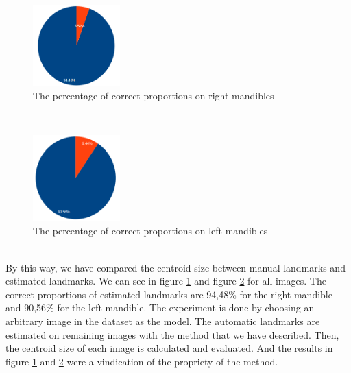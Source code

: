 \documentclass[twoside,twocolumn,10pt]{article}
\begin{document}
\begin{figure}[htb]
    \centering
    \includegraphics[width=0.3\textwidth]{./images/mdresult}
    \caption{The percentage of correct proportions on right mandibles }
    \label{figmdresult}
\end{figure}~\\
\begin{figure}[htb]
    \centering
    \includegraphics[width=0.3\textwidth]{./images/mgresult}
    \caption{The percentage of correct proportions on left mandibles }
    \label{figmgresult}
\end{figure}~\\
By this way, we have compared the centroid size between manual
landmarks and estimated landmarks. We can see in figure
\ref{figmdresult} and figure \ref{figmgresult} for all images. The
correct proportions of estimated landmarks are 94,48\% for the right
mandible and 90,56\% for the left mandible. The experiment is done by choosing an arbitrary 
image in the dataset as the model. The automatic landmarks are estimated on remaining images with the method that we have described. Then, the centroid size of each image is calculated and evaluated. And the results in figure \ref{figmdresult} and \ref{figmgresult} were a vindication of the propriety of the method.\\
\end{document}
